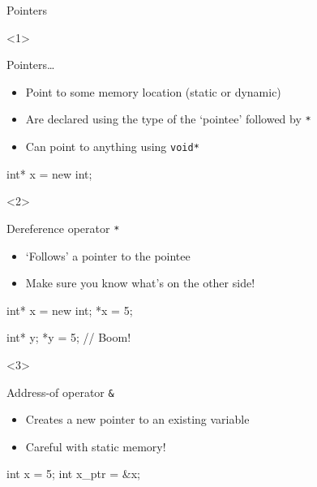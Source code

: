 \begin{frame}[fragile]{Pointers}
    \begin{onlyenv}<1>
        \begin{block}{Pointers\ldots}
            \begin{itemize}
                \item Point to some memory location (static or dynamic)
                \item Are declared using the type of the `pointee' followed by
                      \texttt{*}
                \item Can point to anything using \texttt{void*}
            \end{itemize}
        \end{block}
        \begin{cpp}
            int* x = new int;
        \end{cpp}
    \end{onlyenv}
    \begin{onlyenv}<2>
        \begin{block}{Dereference operator \texttt{*}}
            \begin{itemize}
                \item `Follows' a pointer to the pointee
                \item Make sure you know what's on the other side!
            \end{itemize}
            \begin{cpp}
                int* x = new int;
                *x = 5;

                int* y;
                *y = 5; // Boom!
            \end{cpp}
        \end{block}
    \end{onlyenv}
    \begin{onlyenv}<3>
        \begin{block}{Address-of operator \texttt{&}}
            \begin{itemize}
                \item Creates a new pointer to an existing variable
                \item Careful with static memory!
            \end{itemize}
            \begin{cpp}
                int x = 5;
                int x_ptr = &x;
            \end{cpp}
        \end{block}
    \end{onlyenv}
\end{frame}



